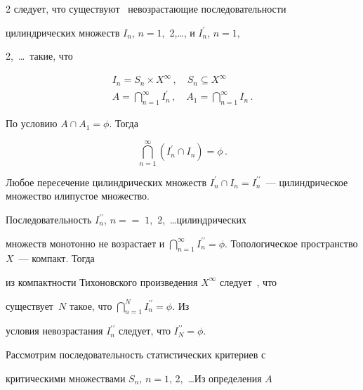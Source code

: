\begin{multicols}{2}
следует, что существуют~\cite{5gr} невозрастающие последовательности 


цилиндрических множеств $I_n$, $n = 1$,\ 2,\ldots, и $I^\prime_n$, $n = 1$, 


2,\  \ldots\ такие, что


\begin{gather*}


I_n = S_n\times X^\infty\,,\quad S_n\subseteq X^\infty\\


A=\bigcap\limits_{n=1}^\infty I^\prime_n\,,\quad A_1=\bigcap\limits_{n=1}^\infty 


I_n\,.


\end{gather*}





    По условию $A\cap A_1=\phi$. Тогда


    $$


    \bigcap\limits_{n=1}^\infty \left ( I^\prime_n \cap I_n\right )=\phi\,.


$$





    Любое пересечение цилиндрических множеств $I^\prime_n\cap 


I_n=I_n^{\prime\prime}$~--- цилиндрическое множество или\linebreak пустое множество. 


Последовательность $I_n^{\prime\prime}$, $n =$\linebreak $=\;1,$ 2,\ \ldots цилиндрических 


множеств монотонно не возрастает и $\bigcap\limits_{n=1}^\infty 


I_n^{\prime\prime}=\phi$. Топологическое пространство $X$~--- компакт. Тогда 


из компактности Тихоновского произведения $X^\infty$ следует~\cite{4gr}, что 


существует~$N$ такое, что $\bigcap\limits_{n=1}^N I_n^{\prime\prime}=\phi$. Из 


условия невозрастания $I_n^{\prime\prime}$ следует, что $I_N^{\prime\prime} 


=\phi$. 


    


    Рассмотрим последовательность статистических критериев с 


критическими множествами $S_n$, $n = 1$, 2,\ \ldots Из определения $A$ 



\end{multicols}
